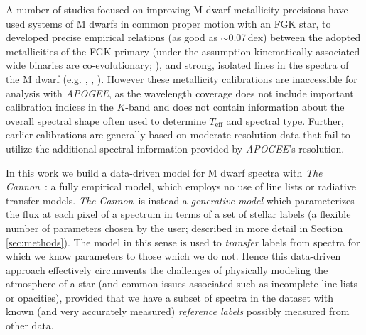 \documentclass[twocolumn]{aastex62}
\newcommand{\apogee}{\textsl{APOGEE}}
\newcommand{\thecannon}{\textsl{The Cannon}}
\newcommand{\teff}{T_{\mathrm{eff}}}
\begin{document}
A number of studies focused on improving M dwarf metallicity precisions have used systems of M dwarfs in common proper motion with an FGK star, to developed precise empirical relations (as good as $\sim$0.07\,dex) between the adopted metallicities of the FGK primary (under the assumption kinematically associated wide binaries are co-evolutionary; \citealt{Bonfils:2005}), and strong, isolated lines in the spectra of the M dwarf (e.g. \citealt{Terrien:2012}, \citealt{Rojas-Ayala:2012}, \citealt{Newton:2014}). However these metallicity calibrations are inaccessible for analysis with \apogee, as the wavelength coverage does not include important calibration indices in the $K$-band and does not contain information about the overall spectral shape often used to determine $\teff$ and spectral type. Further, earlier calibrations are generally based on moderate-resolution data \citep[with some exceptions,][]{Neves:2014, Lindgren:2016} that fail to utilize the additional spectral information provided by \apogee's resolution.



In this work we build a data-driven model for M dwarf spectra with \thecannon\ \citep{Ness:2015,Casey:2016,Ho:2017a,Behmard2019}: a fully empirical model, which employs no use of line lists or radiative transfer models. 
\thecannon\ is instead a \emph{generative model} which parameterizes the flux at each pixel of a spectrum in terms of a set of stellar labels (a flexible number of parameters chosen by the user; described in more detail in Section \ref{sec:methods}). The model in this sense is used to \emph{transfer} labels from spectra for which we know parameters to those which we do not. Hence this data-driven approach effectively circumvents the challenges of physically modeling the atmosphere of a star (and common issues associated such as incomplete line lists or opacities), provided that we have a subset of spectra in the dataset with known (and very accurately measured) \emph{reference labels} possibly measured from other data. 
\end{document}
